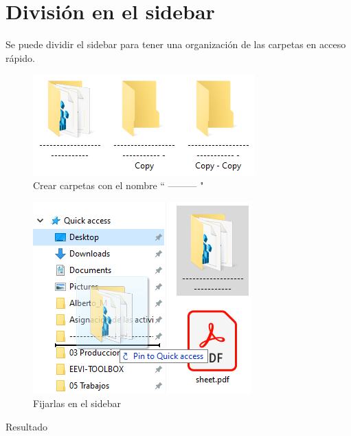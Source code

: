 \documentclass[12pt,letterpaper,final]{report}
\begin{document}
\chapter{División en el sidebar}

Se puede dividir el sidebar para tener una organización de las carpetas en acceso rápido.

\begin{figure}[H]
	\centering
	\includegraphics[width=0.55\linewidth,height=0.45\textheight,keepaspectratio]{Imagenes/fe_division_01}
	\caption{Crear carpetas con el nombre `` --------- "}
	\label{fig:fedivision01}
\end{figure}

\begin{figure}[H]
	\centering
	\includegraphics[width=0.55\linewidth, height=0.45\textheight,keepaspectratio]{Imagenes/fe_division_02}
	\caption{Fijarlas en el sidebar}
	\label{fig:fedivision02}
\end{figure}

\clearpage

{\LARGE Resultado}
\end{document}
